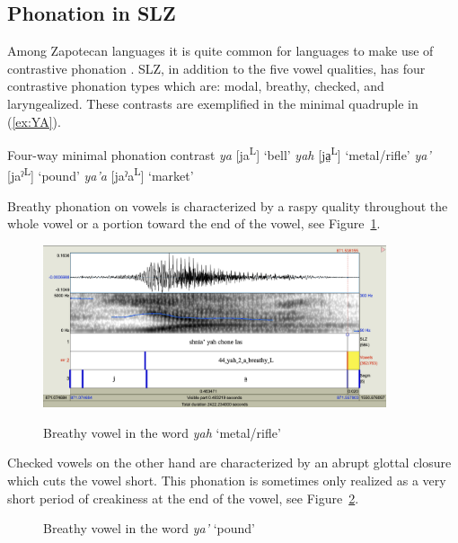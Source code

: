\documentclass[12pt, letterpaper]{article}
\newcommand{\supr}[1]{\textsuperscript{#1}}
\begin{document}
\subsection{Phonation in SLZ} \label{sec:Phonation}

Among Zapotecan languages it is quite common for languages to make use of contrastive phonation \citep[e.g.,][]{avelinobecerraTopicsYalalagZapotec2004,longDiccionarioZapotecoSan2005,avelinoAcousticElectroglottographicAnalyses2010,lopeznicolasEstudiosFonologiaGramatica2016,chavez-peonInteractionMetricalStructure2010}. 
SLZ, in addition to the five vowel qualities, has four contrastive phonation types which are: modal, breathy, checked, and laryngealized. These contrasts are exemplified in the minimal quadruple in (\ref{ex:YA}). 

\ea \label{ex:YA} Four-way minimal phonation contrast
	\ea \textit{ya} [ja\supr{L}]	`bell'
	\ex \textit{yah}  [ja̤\supr{L}] `metal/rifle'
	\ex \textit{ya'}  [jaˀ\supr{L}]  `pound'
	\ex \textit{ya'a}  [jaˀa\supr{L}]  `market'
	\z 
\z 

Breathy phonation on vowels is characterized by a raspy quality throughout the whole vowel or a portion toward the end of the vowel, see Figure~\ref{fig:BreathyVowel}. 

\begin{figure}[!h]
	\centering
	\includegraphics[width=0.9\textwidth]{../yah.png}
	\label{fig:BreathyVowel}
	\caption{Breathy vowel in the word \textit{yah} `metal/rifle'}
\end{figure}

Checked vowels on the other hand are characterized by an abrupt glottal closure which cuts the vowel short. This phonation is sometimes only realized as a very short period of creakiness at the end of the vowel, see Figure~\ref{fig:CheckedVowel}.  

\begin{figure}[!h]
	\label{fig:CheckedVowel}
	\caption{Breathy vowel in the word \textit{ya'} `pound'}
\end{figure}
\end{document}
